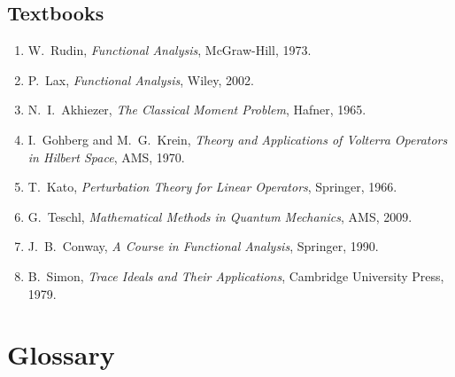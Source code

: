 \subsection*{Textbooks}
\begin{enumerate}
    \item W.\ Rudin, \textit{Functional Analysis}, McGraw-Hill, 1973.
    \item P.\ Lax, \textit{Functional Analysis}, Wiley, 2002.
    \item N.\ I.\ Akhiezer, \textit{The Classical Moment Problem}, Hafner, 1965.
    \item I.\ Gohberg and M.\ G.\ Krein, \textit{Theory and Applications of Volterra Operators in Hilbert Space}, AMS, 1970.
    \item T.\ Kato, \textit{Perturbation Theory for Linear Operators}, Springer, 1966.
    \item G.\ Teschl, \textit{Mathematical Methods in Quantum Mechanics}, AMS, 2009.
    \item J.\ B.\ Conway, \textit{A Course in Functional Analysis}, Springer, 1990.
    \item B.\ Simon, \textit{Trace Ideals and Their Applications}, Cambridge University Press, 1979.
\end{enumerate}

\section*{Glossary}

